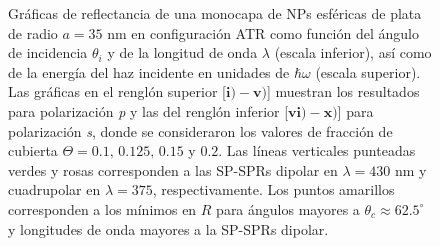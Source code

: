 \begin{figure}[t!]\centering
{}\vspace*{-.5em}
	\caption{Gráficas de reflectancia de una monocapa de NPs esféricas de plata de radio $a=35$ nm en configuración ATR como función del ángulo de incidencia $\theta_i$ y de la longitud de onda $\lambda$ (escala inferior), así como de la energía del haz incidente en unidades de $\hbar\omega$ (escala superior).  Las gráficas   en el renglón superior [$\mathbf{i)-v)}$] muestran los resultados para  polarización \emph{p} y las del renglón inferior  [$\mathbf{vi)-x)}$]  para polarización  \emph{s}, donde se consideraron los valores de fracción de cubierta $\Theta = 0.1,\,0.125,\,0.15$ y $0.2$.  Las líneas verticales punteadas verdes y rosas corresponden a las SP-SPRs dipolar en $\lambda=430$ nm y  cuadrupolar en $\lambda=375$, respectivamente.  Los puntos amarillos corresponden a los mínimos en $R$ para ángulos mayores a $\theta_c\approx 62.5^\circ$ y longitudes de onda mayores a la SP-SPRs dipolar.
}	\label{fig:Ag-R-Theta}	
	\end{figure}	

